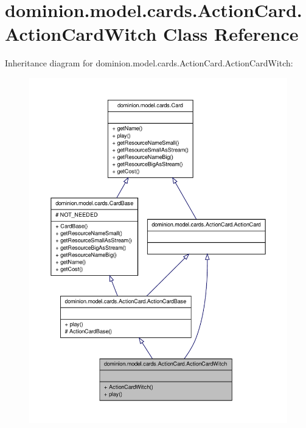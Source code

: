 \hypertarget{classdominion_1_1model_1_1cards_1_1ActionCard_1_1ActionCardWitch}{\section{dominion.\-model.\-cards.\-Action\-Card.\-Action\-Card\-Witch \-Class \-Reference}
\label{classdominion_1_1model_1_1cards_1_1ActionCard_1_1ActionCardWitch}
}


\-Inheritance diagram for dominion.\-model.\-cards.\-Action\-Card.\-Action\-Card\-Witch\-:
\nopagebreak
\begin{figure}[H]
\begin{center}
\leavevmode
\includegraphics[width=350pt]{classdominion_1_1model_1_1cards_1_1ActionCard_1_1ActionCardWitch__inherit__graph}
\end{center}
\end{figure}


